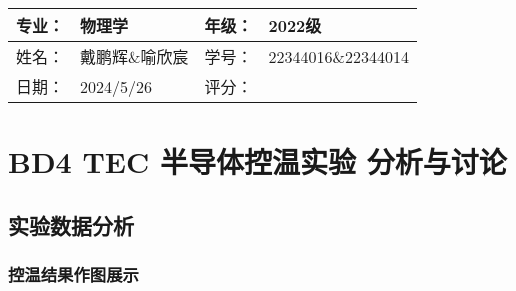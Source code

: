 \documentclass[dvipsnames, svgnames,a4paper,11pt]{article}
\begin{document}
\clearpage
\begin{table}
	\renewcommand\arraystretch{1.7}
	\begin{tabularx}{\textwidth}{|X|X|X|X|}
	\hline
	专业：& 物理学 &年级：& 2022级\\
	\hline
	姓名： & 戴鹏辉\&喻欣宸 & 学号：& 22344016\&22344014\\
	\hline
    日期：& 2024/5/26 & 评分： &\\
	\hline
	\end{tabularx}
\end{table}

\section{BD4 \quad TEC 半导体控温实验 \quad\heiti 分析与讨论}

\subsection{实验数据分析}


\subsubsection{控温结果作图展示}
    
\end{document}
